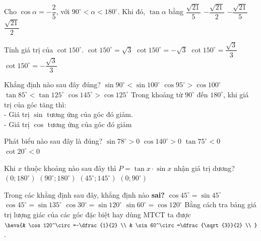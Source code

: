 \begin{ex}
	Cho $\cos\alpha=-\dfrac{2}{5}$, với $90^\circ<\alpha<180^\circ$. Khi đó, $\tan\alpha$ bằng
	\choice
	{$\dfrac{\sqrt{21}}{5}$}
	{\True $-\dfrac{\sqrt{21}}{2}$}
	{$-\dfrac{\sqrt{21}}{5}$}
	{$\dfrac{\sqrt{21}}{2}$}
\end{ex}
\begin{ex}
	Tính giá trị của $\cot150^\circ$.
	\choice
	{$\cot150^\circ=\sqrt{3}$}
	{\True $\cot150^\circ=-\sqrt{3}$}
	{$\cot150^\circ=\dfrac{\sqrt{3}}{3}$}
	{$\cot150^\circ=-\dfrac{\sqrt{3}}{3}$}
\end{ex}
\begin{ex}
	Khẳng định nào sau đây đúng?
	\choice
	{$\sin 90^\circ<\sin 100^\circ$}
	{\True $\cos 95^\circ>\cos 100^\circ$}
	{$\tan 85^\circ<\tan 125^\circ$}
	{$\cos 145^\circ>\cos 125^\circ$}
	\loigiai
	{Trong khoảng từ $90^\circ$ đến $180^\circ$, khi giá trị của góc tăng thì:\\
		- Giá trị $\sin$ tương ứng của góc đó giảm.\\
		- Giá trị $\cos$ tương ứng của góc đó giảm}
\end{ex}
\begin{ex}
	Phát biểu nào sau đây là đúng?
	\choice
	{\True $\sin78^\circ>0$}
	{$\cos 140^\circ>0$}
	{$\tan75^\circ<0$}
	{ $\cot20^\circ<0$}
\end{ex}
\begin{ex} 
	Khi $x$ thuộc khoảng nào sau đây thì $P=\tan x\cdot\sin x$ nhận giá trị dương?
	\choice
	{$\left(0;180^\circ\right)$}
	{$\left(90^\circ;180^\circ\right)$}
	{$\left(45^\circ;145^\circ\right)$}
	{\True $\left(0;90^\circ\right)$}
\end{ex}
\begin{ex}
	Trong các khẳng định sau đây, khẳng định nào \textbf{sai?}
	\choice
	{$\cos 45^\circ=\sin 45^\circ$}
	{$\cos 45^\circ=\sin {135^\circ}$}
	{$\cos 30^\circ=\sin 120^\circ$}
	{\True $\sin 60^\circ=\cos 120^\circ$}
	\loigiai
	{Bằng cách tra bảng giá trị lượng giác của các góc đặc biệt hay dùng MTCT ta được $\heva{& \cos 120^\circ=-\dfrac{1}{2} \\ 
			& \sin 60^\circ=\dfrac{\sqrt{3}}{2} \\ 
		}$.}
\end{ex}

